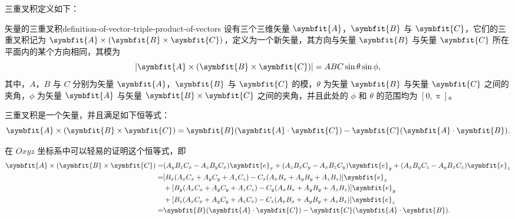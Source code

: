三重叉积定义如下：
\begin{definition}{矢量的三重叉积}{definition-of-vector-triple-product-of-vectors}
    设有三个三维矢量 $ \symbfit{A} $，$ \symbfit{B} $ 与 $ \symbfit{C} $，它们的三重叉积记为 $ \symbfit{A} \times (\symbfit{B} \times \symbfit{C}) $，定义为一个新矢量，其方向与矢量 $ \symbfit{B} $ 与矢量 $ \symbfit{C} $ 所在平面内的某个方向相同，其模为
    \begin{equation}
        |\symbfit{A} \times (\symbfit{B} \times \symbfit{C})| = AB C \sin \theta \sin \phi ,
    \end{equation}
    其中，$ A $，$ B $ 与 $ C $ 分别为矢量 $ \symbfit{A} $，$ \symbfit{B} $ 与 $ \symbfit{C} $ 的模，$ \theta $ 为矢量 $ \symbfit{B} $ 与矢量 $ \symbfit{C} $ 之间的夹角，$ \phi $ 为矢量 $ \symbfit{A} $ 与矢量 $ \symbfit{B} \times \symbfit{C} $ 之间的夹角，并且此处的 $ \phi $ 和 $ \theta $ 的范围均为 $ [0 , \uppi] $。
\end{definition}
三重叉积是一个矢量，并且满足如下恒等式：
\begin{equation}
    \symbfit{A} \times (\symbfit{B} \times \symbfit{C}) = \symbfit{B} (\symbfit{A} \cdot \symbfit{C}) - \symbfit{C} (\symbfit{A} \cdot \symbfit{B}) .
\end{equation}

在 $ Oxyz $ 坐标系中可以轻易的证明这个恒等式，即
\begin{equation}
    \begin{aligned}
        \symbfit{A} \times (\symbfit{B} \times \symbfit{C}) = & (A_y B_z C_x - A_z B_y C_x) \symbfit{e}_x + (A_z B_x C_y - A_x B_z C_y) \symbfit{e}_y + (A_x B_y C_z - A_y B_x C_z) \symbfit{e}_z \\
        =                                                     & [B_x (A_x C_x + A_y C_y + A_z C_z) - C_x (A_x B_x + A_y B_y + A_z B_z)] \symbfit{e}_x                                             \\
                                                              & + [B_y (A_x C_x + A_y C_y + A_z C_z) - C_y (A_x B_x + A_y B_y + A_z B_z)] \symbfit{e}_y                                           \\
                                                              & + [B_z (A_x C_x + A_y C_y + A_z C_z) - C_z (A_x B_x + A_y B_y + A_z B_z)] \symbfit{e}_z                                           \\
        =                                                     & \symbfit{B} (\symbfit{A} \cdot \symbfit{C}) - \symbfit{C} (\symbfit{A} \cdot \symbfit{B}) .
    \end{aligned}
\end{equation}

